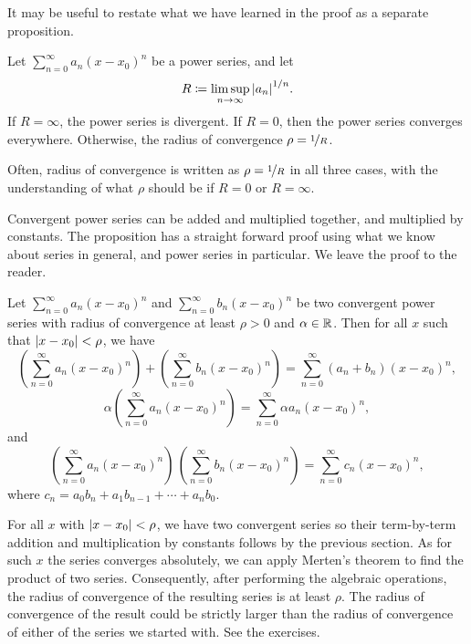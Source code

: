 It may be useful to restate what we have learned in the proof
as a separate proposition.

\begin{prop}
Let $\sum_{n=0}^\infty a_n {(x-x_0)}^n$ be a power series, and let
\begin{equation*}
R \coloneqq \limsup_{n\to\infty} {\left\lvert {a_n} \right\rvert}^{1/n} .
\end{equation*}
If $R = \infty$, the power series is divergent.  If
$R=0$, then the power series converges everywhere.   Otherwise,
the radius of convergence $\rho = \nicefrac{1}{R}$.
\end{prop}

Often, radius of convergence is written as $\rho = \nicefrac{1}{R}$ in all
three cases, with
the understanding of what $\rho$ should be if $R = 0$ or $R =
\infty$.

\pagebreak[2]
Convergent power series can be added and multiplied together, and multiplied
by constants.
The proposition has a straight forward proof using what we know about series
in general, and power series in particular.  We leave the proof to the reader.

\begin{prop}
Let $\sum_{n=0}^\infty a_n {(x-x_0)}^n$ and
$\sum_{n=0}^\infty b_n {(x-x_0)}^n$ be two convergent power series
with radius of convergence at least $\rho > 0$ and $\alpha \in {\mathbb{R}}$.  Then
for all $x$ such that $\left\lvert {x-x_0} \right\rvert < \rho$, we have 
\begin{equation*}
\left(\sum_{n=0}^\infty a_n {(x-x_0)}^n\right)
+
\left(\sum_{n=0}^\infty b_n {(x-x_0)}^n\right)
=
\sum_{n=0}^\infty (a_n+b_n) {(x-x_0)}^n ,
\end{equation*}
\begin{equation*}
\alpha
\left(\sum_{n=0}^\infty a_n {(x-x_0)}^n\right)
=
\sum_{n=0}^\infty \alpha a_n {(x-x_0)}^n ,
\end{equation*}
and
\begin{equation*}
\left(\sum_{n=0}^\infty a_n {(x-x_0)}^n\right)
\,
\left(\sum_{n=0}^\infty b_n {(x-x_0)}^n\right)
=
\sum_{n=0}^\infty c_n {(x-x_0)}^n ,
\end{equation*}
where
$c_n = a_0b_n + a_1 b_{n-1} + \cdots + a_n b_0$.
\end{prop}

For all $x$ with $\left\lvert {x-x_0} \right\rvert < \rho$, we have two convergent series so
their term-by-term addition and multiplication by constants
follows by the previous section.
As for such $x$ the series converges absolutely,
we can apply Merten's theorem to find the product of two series.
Consequently, after performing the algebraic operations, the
radius of convergence of the resulting series is at least $\rho$.
The radius of convergence of the result could be strictly larger than
the radius of convergence of either of the series we started with.
See the exercises.

